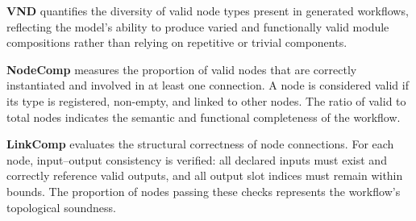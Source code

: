 \documentclass[runningheads]{llncs}
\begin{document}


\noindent \textbf{VND} quantifies the diversity of valid node types present in generated workflows, reflecting the model’s ability to produce varied and functionally valid module compositions rather than relying on repetitive or trivial components.

\noindent \textbf{NodeComp} measures the proportion of valid nodes that are correctly instantiated and involved in at least one connection. A node is considered valid if its type is registered, non-empty, and linked to other nodes. The ratio of valid to total nodes indicates the semantic and functional completeness of the workflow.

\noindent \textbf{LinkComp} evaluates the structural correctness of node connections. For each node, input–output consistency is verified: all declared inputs must exist and correctly reference valid outputs, and all output slot indices must remain within bounds. The proportion of nodes passing these checks represents the workflow’s topological soundness.
\end{document}
